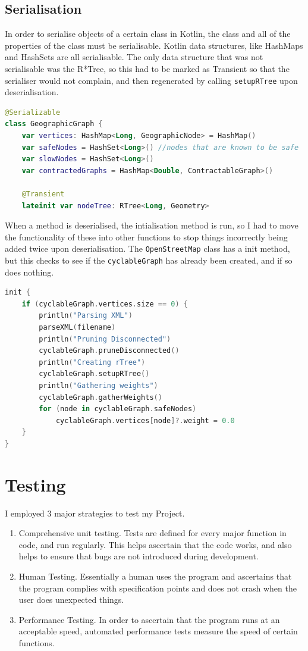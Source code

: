 \documentclass[11pt,twoside,a4paper]{report}
\begin{document}
\section{Serialisation}
In order to serialise objects of a certain class in Kotlin, the class and all of the properties of the class must be serialisable. Kotlin data structures, like HashMaps and HashSets are all serialisable.
The only data structure that was not serialisable was the R*Tree, so this had to be marked as Transient so that the serialiser would not complain, and then regenerated by calling \texttt{setupRTree} upon deserialisation.
\begin{lstlisting}[language=kotlin]
@Serializable
class GeographicGraph {
    var vertices: HashMap<Long, GeographicNode> = HashMap()
    var safeNodes = HashSet<Long>() //nodes that are known to be safe
    var slowNodes = HashSet<Long>()
    var contractedGraphs = HashMap<Double, ContractableGraph>()

    @Transient
    lateinit var nodeTree: RTree<Long, Geometry>
\end{lstlisting}
When a method is deserialised, the intialisation method is run, so I had to move the functionality of these into other functions to stop things incorrectly being added twice upon deserialisation.
The \texttt{OpenStreetMap} class has a init method, but this checks to see if the \texttt{cyclableGraph} has already been created, and if so does nothing.
\begin{lstlisting}[language=kotlin]
init {
    if (cyclableGraph.vertices.size == 0) {
        println("Parsing XML")
        parseXML(filename)
        println("Pruning Disconnected")
        cyclableGraph.pruneDisconnected()
        println("Creating rTree")
        cyclableGraph.setupRTree()
        println("Gathering weights")
        cyclableGraph.gatherWeights()
        for (node in cyclableGraph.safeNodes)
            cyclableGraph.vertices[node]?.weight = 0.0
    }
}
\end{lstlisting}
\newpage
\chapter{Testing}
I employed 3 major strategies to test my Project.
\begin{enumerate}
    \item Comprehensive unit testing. Tests are defined for every major function in code, and run regularly. This helps ascertain that the code works, and also helps to ensure that bugs are not introduced during development.
    \item Human Testing. Essentially a human uses the program and ascertains that the program complies with specification points and does not crash when the user does unexpected things.
    \item Performance Testing. In order to ascertain that the program runs at an acceptable speed, automated performance tests measure the speed of certain functions.
\end{enumerate}
\end{document}
